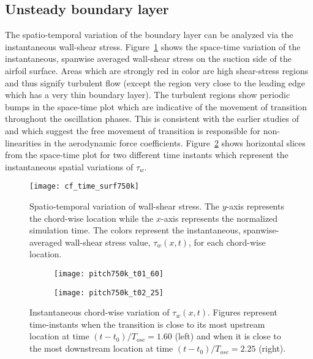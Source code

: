 \subsection{Unsteady boundary layer}
The spatio-temporal variation of the boundary layer can be analyzed via the instantaneous wall-shear stress. Figure~\ref{fig:space-time_color750k} shows the space-time variation of the instantaneous, spanwise averaged wall-shear stress on the suction side of the airfoil surface. Areas which are strongly red in color are high shear-stress regions and thus signify turbulent flow (except the region very close to the leading edge which has a very thin boundary layer). The turbulent regions show periodic bumps in the space-time plot which are indicative of the movement of transition throughout the oscillation phases. This is consistent with the earlier studies of \cite{mai11,hebler13} and \cite{lokattthesis} which suggest the free movement of transition is responsible for non-linearities in the aerodynamic force coefficients. Figure~\ref{fig:750k_cf_x} shows horizontal slices from the space-time plot for two different time instants which represent the instantaneous spatial variations of $\tau_{w}$.  
\begin{figure}[!h]
   	\centering
	\texttt{[image: cf\_time\_surf750k]}		
	\caption{Spatio-temporal variation of wall-shear stress. The $y$-axis represents the chord-wise location while the $x$-axis represents the normalized simulation time. The colors represent the instantaneous, spanwise-averaged wall-shear stress value, $\tau_{w}(x,t)$, for each chord-wise location.}	
	\label{fig:space-time_color750k}
\end{figure}
\begin{figure}[!h]
	\centering
	\begin{subfigure}[t]{0.49\linewidth}
		\texttt{[image: pitch750k\_t01\_60]}
	\end{subfigure}
	\begin{subfigure}[t]{0.49\textwidth}			
		\texttt{[image: pitch750k\_t02\_25]}
	\end{subfigure}
	\caption{Instantaneous chord-wise variation of $\tau_{w}(x,t)$. Figures represent time-instants when the transition is close to its most upstream location at time $(t-t_{0})/T_{osc}=1.60$ (left) and when it is close to the most downstream location at time $(t-t_{0})/T_{osc}=2.25$ (right).}
	\label{fig:750k_cf_x}	
\end{figure}

